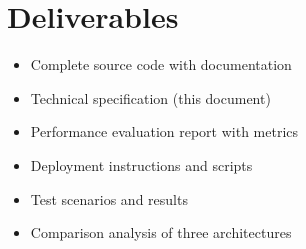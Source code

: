 \documentclass[11pt,a4paper]{article}
\begin{document}
\section{Deliverables}

\begin{itemize}
    \item Complete source code with documentation
    \item Technical specification (this document)
    \item Performance evaluation report with metrics
    \item Deployment instructions and scripts
    \item Test scenarios and results
    \item Comparison analysis of three architectures
\end{itemize}
\end{document}
